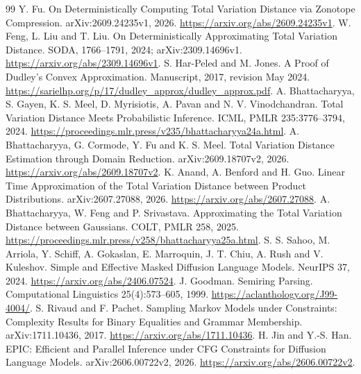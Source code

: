 \documentclass[11pt]{article}
\begin{document}
\begin{thebibliography}{99}
 Y. Fu. On Deterministically Computing Total Variation Distance
via Zonotope Compression. arXiv:2609.24235v1, 2026.
\url{https://arxiv.org/abs/2609.24235v1}.
 W. Feng, L. Liu and T. Liu. On Deterministically Approximating
Total Variation Distance. SODA, 1766--1791, 2024; arXiv:2309.14696v1.
\url{https://arxiv.org/abs/2309.14696v1}.
 S. Har-Peled and M. Jones. A Proof of Dudley's Convex
Approximation. Manuscript, 2017, revision May 2024.
\url{https://sarielhp.org/p/17/dudley_approx/dudley_approx.pdf}.
 A. Bhattacharyya, S. Gayen, K. S. Meel, D. Myrisiotis,
A. Pavan and N. V. Vinodchandran. Total Variation Distance Meets Probabilistic
Inference. ICML, PMLR 235:3776--3794, 2024.
\url{https://proceedings.mlr.press/v235/bhattacharyya24a.html}.
 A. Bhattacharyya, G. Cormode, Y. Fu and K. S. Meel.
Total Variation Distance Estimation through Domain Reduction.
arXiv:2609.18707v2, 2026. \url{https://arxiv.org/abs/2609.18707v2}.
 K. Anand, A. Benford and H. Guo. Linear Time Approximation
of the Total Variation Distance between Product Distributions.
arXiv:2607.27088, 2026. \url{https://arxiv.org/abs/2607.27088}.
 A. Bhattacharyya, W. Feng and P. Srivastava.
Approximating the Total Variation Distance between Gaussians.
COLT, PMLR 258, 2025.
\url{https://proceedings.mlr.press/v258/bhattacharyya25a.html}.
 S. S. Sahoo, M. Arriola, Y. Schiff, A. Gokaslan, E. Marroquin,
J. T. Chiu, A. Rush and V. Kuleshov. Simple and Effective Masked Diffusion
Language Models. NeurIPS 37, 2024. \url{https://arxiv.org/abs/2406.07524}.
 J. Goodman. Semiring Parsing.
Computational Linguistics 25(4):573--605, 1999.
\url{https://aclanthology.org/J99-4004/}.
 S. Rivaud and F. Pachet. Sampling Markov Models under
Constraints: Complexity Results for Binary Equalities and Grammar Membership.
arXiv:1711.10436, 2017. \url{https://arxiv.org/abs/1711.10436}.
 H. Jin and Y.-S. Han. EPIC: Efficient and Parallel Inference
under CFG Constraints for Diffusion Language Models.
arXiv:2606.00722v2, 2026. \url{https://arxiv.org/abs/2606.00722v2}.
\end{thebibliography}
\end{document}
